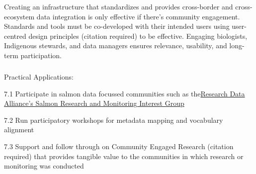\documentclass[
  letterpaper,
  DIV=11,
  numbers=noendperiod]{scrartcl}
\makeatletter
\let\oldsubparagraph\subparagraph
\renewcommand{\subparagraph}{
    \@ifstar
      \xxxSubParagraphStar
      \xxxSubParagraphNoStar
  }
\newcommand{\xxxSubParagraphStar}[1]{\oldsubparagraph*{#1}\mbox{}}
\newcommand{\xxxSubParagraphNoStar}[1]{\oldsubparagraph{#1}\mbox{}}
\makeatother
\begin{document}
Creating an infrastructure that standardizes and provides cross-border
and cross-ecosystem data integration is only effective if there's
community engagement. Standards and tools must be co-developed with
their intended users using user-centred design principles (citation
required) to be effective. Engaging biologists, Indigenous stewards, and
data managers ensures relevance, usability, and long-term participation.

\subparagraph{Practical Applications:}\label{practical-applications-6}

7.1 Participate in salmon data focussed communities such as
the\href{https://www.rd-alliance.org/groups/salmon-research-and-monitoring-ig/}{Research
Data Alliance's Salmon Research and Monitoring Interest Group}~

7.2 Run participatory workshops for metadata mapping and vocabulary
alignment

7.3 Support and follow through on Community Engaged Research (citation
required) that provides tangible value to the communities in which
research or monitoring was conducted
\end{document}
